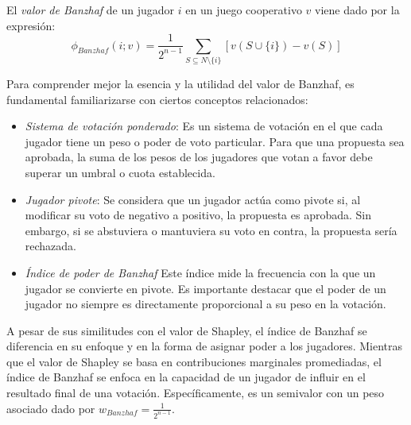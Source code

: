 \begin{definition}
  El \emph{valor de Banzhaf} de un jugador $i$ en un juego
  cooperativo $v$ viene dado por la expresión:
  \begin{equation}
    \label{banzhafFormula}
    \phi_{Banzhaf}(i;v) = \frac{1}{2^{n-1}} \sum_{S
    \subseteq N \setminus \{i\}} [v(S \cup \{i\}) - v(S)]
  \end{equation}
\end{definition}

Para comprender mejor la esencia y la utilidad del valor de
Banzhaf, es fundamental familiarizarse con ciertos conceptos
relacionados:

\begin{itemize}
  \item \emph{Sistema de votación ponderado}: Es un sistema de
  votación en el que cada jugador tiene un peso o poder de voto
  particular. Para que una propuesta sea aprobada, la suma de los
  pesos de los jugadores que votan a favor debe superar un
  umbral o cuota establecida.

  \item \emph{Jugador pivote}: Se considera que un jugador actúa
  como pivote si, al modificar su voto de negativo a positivo,
  la propuesta es aprobada. Sin embargo, si se abstuviera o
  mantuviera su voto en contra, la propuesta sería rechazada.

  \item \emph{Índice de poder de Banzhaf} Este índice mide la
  frecuencia con la que un jugador se convierte en pivote.
  Es importante destacar que el poder de un jugador no siempre
  es directamente proporcional a su peso en la votación.
\end{itemize}

A pesar de sus similitudes con el valor de Shapley, el índice
de Banzhaf se diferencia en su enfoque y en la forma de asignar
poder a los jugadores.
Mientras que el valor de Shapley se basa en contribuciones
marginales promediadas, el índice de Banzhaf se enfoca en la
capacidad de un jugador de influir en el resultado final de
una votación. Específicamente, es un semivalor
con un peso asociado dado por $w_{Banzhaf} = \frac{1}{2^{n-1}}$.



